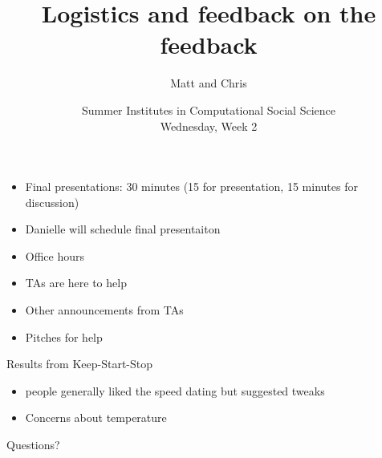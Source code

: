\documentclass{beamer}
\title[]{Logistics and feedback on the feedback}
\author[]{Matt and Chris}
\date[]{Summer Institutes in Computational Social Science\\Wednesday, Week 2}
\begin{document}
\frame{\titlepage}
\begin{frame}

\begin{itemize}
\item Final presentations: 30 minutes (15 for presentation, 15 minutes for discussion)
\pause
\item Danielle will schedule final presentaiton
\pause
\item Office hours
\pause
\item TAs are here to help
\pause
\item Other announcements from TAs
\pause
\item Pitches for help
\end{itemize}

\end{frame}
\begin{frame}

Results from Keep-Start-Stop
\begin{itemize}
\item people generally liked the speed dating but suggested tweaks
\pause
\item Concerns about temperature
\end{itemize}

\end{frame}
\begin{frame}

\begin{center}
\LARGE
Questions?
\end{center}

\end{frame}
\end{document}
